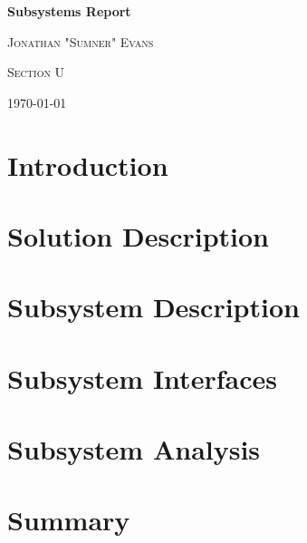 \documentclass[11pt]{article}
\author{Jonathan "Sumner" Evans}
\date{\today}
\begin{document}
\begin{titlepage}
    \centering
    \vspace{15cm}
    {\huge\bfseries Subsystems Report \par}
    \vspace{1cm}
    {\scshape\Large Jonathan "Sumner" Evans\par}
    \vfill
    {\scshape\large Section U\par}
    {\large \today\par}
    \vfill
\end{titlepage}

\section{Introduction}

\section{Solution Description}

\section{Subsystem Description}

\section{Subsystem Interfaces}

\section{Subsystem Analysis}

\section{Summary}
\end{document}
